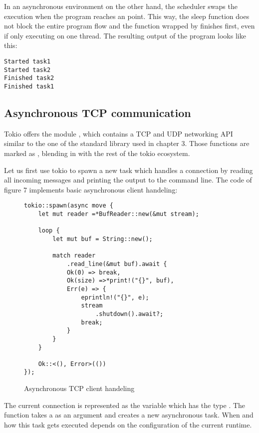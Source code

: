 In an asynchronous environment on the other hand, the scheduler swaps the execution when the program reaches an
 point. This way, the sleep function does not block the entire program flow and the function wrapped by
 finishes first, even if only executing on one thread. The resulting output of the program looks like
this:

\begin{verbatim}
Started task1
Started task2
Finished task2
Finished task1
\end{verbatim}

\subsection{Asynchronous TCP communication}
Tokio offers the module , which contains a TCP and UDP networking API similar to the one of the
standard library used in chapter 3. Those functions are marked as , blending in with the rest of the tokio
ecosystem.

Let us first use tokio to spawn a new task which handles a connection by reading all incoming messages and printing the
output to the command line. The code of figure 7 implements basic asynchronous client handeling:

\begin{figure}[h]
    \begin{verbatim}
tokio::spawn(async move {
    let mut reader =*BufReader::new(&mut stream);

    loop {
        let mut buf = String::new();

        match reader
            .read_line(&mut buf).await {
            Ok(0) => break,
            Ok(size) =>*print!("{}", buf),
            Err(e) => {
                eprintln!("{}", e);
                stream
                    .shutdown().await?;
                break;
            }
        }
    }

    Ok::<(), Error>(())
});
    \end{verbatim}
    \caption{Asynchronous TCP client handeling}
\end{figure}

The current connection is represented as the variable  which has the type .
The function  takes a  as an argument and creates a new asynchronous task. When and how
this task gets executed depends on the configuration of the current runtime.

